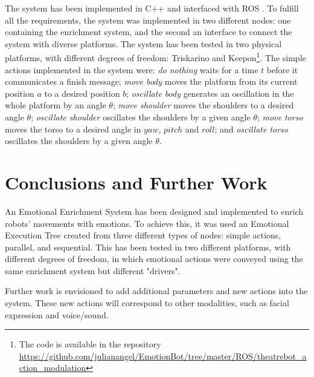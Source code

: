 \documentclass{sig-alternate-05-2015}
\begin{document}
The system has been implemented in C++ and interfaced with ROS %
. To fulfill all the requirements, the system was implemented in two different nodes: one containing the enrichment system, and the second an interface to connect the system with diverse platforms. The system has been tested in two physical platforms, with different degrees of freedom: Triskarino%
 and Keepon\footnote{ The code is available in the repository \url{https://github.com/julianangel/EmotionBot/tree/master/ROS/theatrebot_action_modulation}}. The simple actions implemented in the system were: \textit{do nothing} waits for a time $t$ before it communicates a finish message; \textit{move body} moves the platform from its current position $a$ to a desired position $b$; \textit{oscillate body} generates an oscillation in the whole platform by an angle $\theta$; \textit{move shoulder} moves the shoulders to a desired angle $\theta$; \textit{oscillate shoulder} oscillates the shoulders by a given angle $\theta$; \textit{move torso} moves the torso to a desired angle in $yaw$, $pitch$ and $roll$; and \textit{oscillate torso} oscillates the shoulders by a given angle $\theta$.

\section{Conclusions and Further Work}

An Emotional Enrichment System has been designed and implemented to enrich robots' movements with emotions. To achieve this, it was used an Emotional Execution Tree created from three different types of nodes: simple actions, parallel, and sequential. This has been tested in two different platforms, with different degrees of freedom, in which emotional actions were conveyed using the same enrichment system but different "drivers". 

Further work is envisioned to add additional parameters and new actions into the system. These new actions will correspond to other modalities, such as facial expression and voice/sound.


\end{document}
